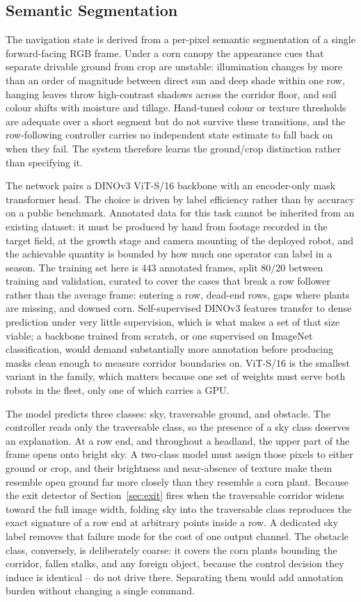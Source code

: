 \documentclass[conference]{IEEEtran}
\begin{document}
\subsection{Semantic Segmentation}
The navigation state is derived from a per-pixel semantic segmentation of a
single forward-facing RGB frame. Under a corn canopy the appearance cues that
separate drivable ground from crop are unstable: illumination changes by more
than an order of magnitude between direct sun and deep shade within one row,
hanging leaves throw high-contrast shadows across the corridor floor, and soil
colour shifts with moisture and tillage. Hand-tuned colour or texture
thresholds are adequate over a short segment but do not survive these
transitions, and the row-following controller carries no independent state
estimate to fall back on when they fail. The system therefore learns the
ground/crop distinction rather than specifying it.

The network pairs a DINOv3 ViT-S/16 backbone with an encoder-only mask
transformer head. The choice is driven by label efficiency rather than by
accuracy on a public benchmark. Annotated data for this task cannot be
inherited from an existing dataset: it must be produced by hand from footage
recorded in the target field, at the growth stage and camera mounting of the
deployed robot, and the achievable quantity is bounded by how much one operator
can label in a season. The training set here is 443 annotated frames, split
$80/20$ between training and validation, curated to cover the cases that break a
row follower rather than the average frame: entering a row, dead-end rows, gaps
where plants are missing, and downed corn. Self-supervised DINOv3 features transfer to dense prediction
under very little supervision, which is what makes a set of that size viable;
a backbone trained from scratch, or one supervised on ImageNet classification,
would demand substantially more annotation before producing masks clean enough
to measure corridor boundaries on. ViT-S/16 is the smallest variant in the
family, which matters because one set of weights must serve both robots in the
fleet, only one of which carries a GPU.

The model predicts three classes: sky, traversable ground, and obstacle. The
controller reads only the traversable class, so the presence of a sky class
deserves an explanation. At a row end, and throughout a headland, the upper
part of the frame opens onto bright sky. A two-class model must assign those
pixels to either ground or crop, and their brightness and near-absence of
texture make them resemble open ground far more closely than they resemble a
corn plant. Because the exit detector of Section~\ref{sec:exit} fires when the
traversable corridor widens toward the full image width, folding sky into the
traversable class reproduces the exact signature of a row end at arbitrary
points inside a row. A dedicated sky label removes that failure mode for the
cost of one output channel. The obstacle class, conversely, is deliberately
coarse: it covers the corn plants bounding the corridor, fallen stalks, and
any foreign object, because the control decision they induce is identical --
do not drive there. Separating them would add annotation burden without
changing a single command.
\end{document}
